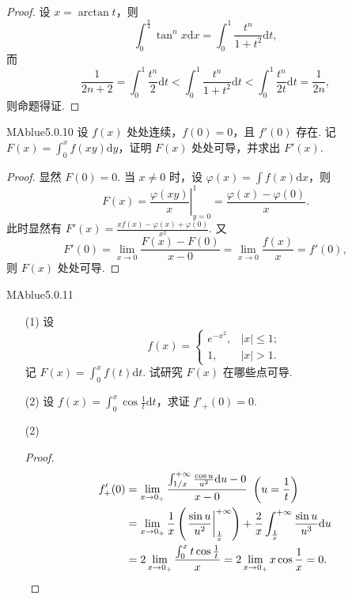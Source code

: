\begin{proof}
    设 $x = \arctan t$，则
    \[
        \int_0^{\frac \pi 4} \tan^n x \mathrm dx = \int_0^1 \frac{t^n}{1+t^2} \mathrm dt,
    \]
    而
    \[
        \frac 1 {2n+2} = \int_0^1 \frac {t^n} 2 \mathrm dt < \int_0^1 \frac{t^n}{1+t^2} \mathrm dt < \int_0^1 \frac{t^n}{2t} \mathrm dt = \frac 1 {2n},
    \]
    则命题得证.
\end{proof}

\begin{problem}{MAblue}{5.0.10}
    设 $f(x)$ 处处连续，$f(0) = 0$，且 $f'(0)$ 存在. 记 $F(x) = \int_0^x f(xy) \mathrm dy$，证明 $F(x)$ 处处可导，并求出 $F'(x)$.
\end{problem}

\begin{proof}
    显然 $F(0) = 0$. 当 $x \neq 0$ 时，设 $\varphi(x) = \int f(x) \mathrm dx$，则
    \[
        F(x) = \left. \frac {\varphi(xy)} x \right|_{y=0}^1 = \frac {\varphi(x) - \varphi(0)} x.
    \]
    此时显然有 $F'(x) = \frac{xf(x) - \varphi(x) + \varphi(0)}{x^2}$. 又
    \[
        F'(0) = \lim_{x \to 0} \frac{F(x) - F(0)}{x - 0} = \lim_{x \to 0} \frac {f(x)} x = f'(0),
    \]
    则 $F(x)$ 处处可导.
\end{proof}

\begin{problem}{MAblue}{5.0.11}
    \begin{enumerate}
        \item[(1)]
        设
        \[
            f(x) = \begin{cases}
                e^{-x^2}, & |x| \leqslant 1; \\
                1, & |x| > 1.
            \end{cases}
        \]
        记 $F(x) = \int_0^x f(t) \mathrm dt$. 试研究 $F(x)$ 在哪些点可导.
        \item[(2)]
        设 $f(x) = \int_0^x \cos \frac 1 t \mathrm dt$，求证 $f'_+(0) = 0$.
    \end{enumerate}
\end{problem}

\begin{enumerate}
    \item[(2)]
    \begin{proof}
        \begin{align*}
            f'_+(0) &= \lim_{x \to 0_+} \frac{\int_{1/x}^{+\infty} \frac{\cos u}{u^2} \mathrm du - 0}{x - 0} \ \left( u = \frac 1 t \right) \\
            &= \lim_{x \to 0_+} \frac 1 x \left( \left. \frac{\sin u}{u^2} \right|_{\frac 1 x}^{+\infty} \right) + \frac 2 x \int_{\frac 1 x}^{+\infty} \frac{\sin u}{u^3} \mathrm du \\
            &= 2 \lim_{x \to 0_+} \frac{\int_0^x t \cos \frac 1 t}{x} = 2 \lim_{x \to 0_+} x \cos \frac 1 x = 0. \qedhere
        \end{align*}
    \end{proof}
\end{enumerate}

